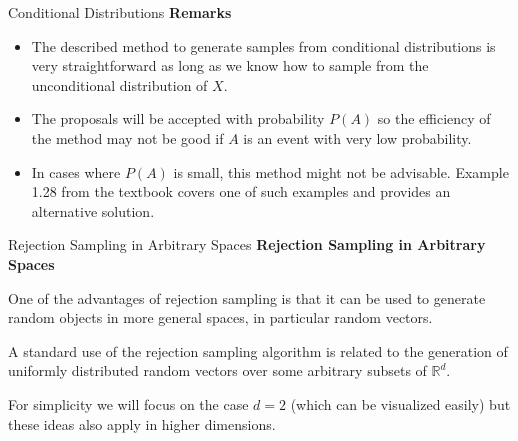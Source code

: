 \documentclass[8pt]{beamer}
\begin{document}
\begin{frame}{Conditional Distributions}
\textbf{Remarks}

\vspace{3mm}

\begin{itemize}
	\item The described method to generate samples from conditional distributions is very straightforward as long as we know how to sample from the unconditional distribution of $X$.
	\item The proposals will be accepted with probability $P(A)$ so the efficiency of the method may not be good if $A$ is an event with very low probability.
	\item In cases where $P(A)$ is small, this method might not be advisable. Example 1.28 from the textbook covers one of such examples and provides an alternative solution.
\end{itemize}
\end{frame}


\begin{frame}{Rejection Sampling in Arbitrary Spaces}
\textbf{Rejection Sampling in Arbitrary Spaces}

\vspace{2mm}

One of the advantages of rejection sampling is that it can be used to generate random objects in more general spaces, in particular random vectors.

\vspace{2mm}

A standard use of the rejection sampling algorithm is related to the generation of uniformly distributed random vectors over some arbitrary subsets of $\mathbb{R}^d$.

\vspace{2mm}

For simplicity we will focus on the case $d=2$ (which can be visualized easily) but these ideas also apply in higher dimensions.
\end{frame}
\end{document}
